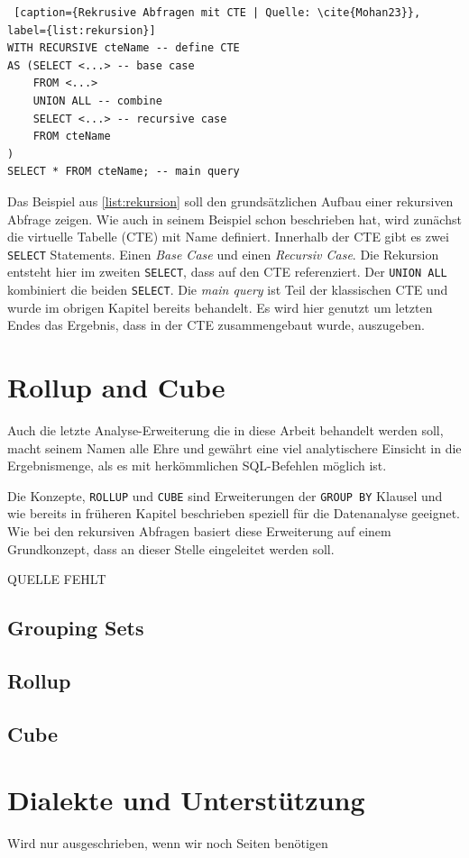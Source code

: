 \begin{lstlisting} [caption={Rekrusive Abfragen mit CTE | Quelle: \cite{Mohan23}}, label={list:rekursion}]
WITH RECURSIVE cteName -- define CTE
AS (SELECT <...> -- base case
	FROM <...>
	UNION ALL -- combine
	SELECT <...> -- recursive case
	FROM cteName
)
SELECT * FROM cteName; -- main query
\end{lstlisting}

Das Beispiel aus \ref{list:rekursion} soll den grundsätzlichen Aufbau einer rekursiven
Abfrage zeigen. Wie auch \cite{Mohan23} in seinem Beispiel schon beschrieben hat,
wird zunächst die virtuelle Tabelle (CTE) mit Name definiert. Innerhalb der CTE
gibt es zwei \texttt{SELECT} Statements. Einen \textit{Base Case} und einen \textit{Recursiv
Case}. Die Rekursion entsteht hier im zweiten \texttt{SELECT}, dass auf den CTE referenziert.
Der \texttt{UNION ALL} kombiniert die beiden \texttt{SELECT}. Die \textit{main
query} ist Teil der klassischen CTE und wurde im obrigen Kapitel bereits
behandelt. Es wird hier genutzt um letzten Endes das Ergebnis, dass in der CTE
zusammengebaut wurde, auszugeben.


\section{Rollup and Cube}
Auch die letzte Analyse-Erweiterung die in diese Arbeit behandelt werden soll, macht
seinem Namen alle Ehre und gewährt eine viel analytischere Einsicht in die Ergebnismenge,
als es mit herkömmlichen SQL-Befehlen möglich ist.

Die Konzepte, \texttt{ROLLUP} und \texttt{CUBE} sind Erweiterungen der \texttt{GROUP
BY} Klausel und wie bereits in früheren Kapitel beschrieben speziell für die
Datenanalyse geeignet. Wie bei den rekursiven Abfragen basiert diese Erweiterung
auf einem Grundkonzept, dass an dieser Stelle eingeleitet werden soll.

QUELLE FEHLT

\subsection{Grouping Sets}

\subsection{Rollup}

\subsection{Cube}


\section{Dialekte und Unterstützung}
Wird nur ausgeschrieben, wenn wir noch Seiten benötigen